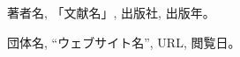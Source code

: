 \documentclass{docs}
\begin{document}
\begin{thebibliography}{99}
    著者名, 「文献名」, 出版社, 出版年。

    団体名, “ウェブサイト名”, URL, 閲覧日。
\end{thebibliography}
\end{document}
